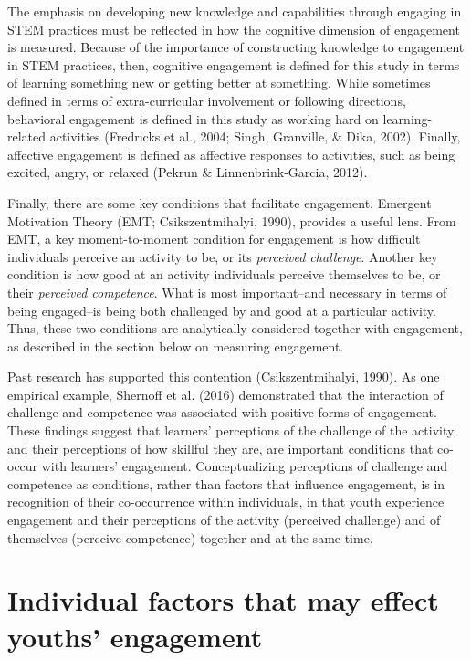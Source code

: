 \documentclass[]{msu-thesis}
\theoremstyle{definition}
\theoremstyle{definition}
\theoremstyle{definition}
\theoremstyle{remark}
\begin{document}
The emphasis on developing new knowledge and capabilities through
engaging in STEM practices must be reflected in how the cognitive
dimension of engagement is measured. Because of the importance of
constructing knowledge to engagement in STEM practices, then, cognitive
engagement is defined for this study in terms of learning something new
or getting better at something. While sometimes defined in terms of
extra-curricular involvement or following directions, behavioral
engagement is defined in this study as working hard on learning-related
activities (Fredricks et al., 2004; Singh, Granville, \& Dika, 2002).
Finally, affective engagement is defined as affective responses to
activities, such as being excited, angry, or relaxed (Pekrun \&
Linnenbrink-Garcia, 2012).

Finally, there are some key conditions that facilitate engagement.
Emergent Motivation Theory (EMT; Csikszentmihalyi, 1990), provides a
useful lens. From EMT, a key moment-to-moment condition for engagement
is how difficult individuals perceive an activity to be, or its
\emph{perceived challenge}. Another key condition is how good at an
activity individuals perceive themselves to be, or their \emph{perceived
competence}. What is most important--and necessary in terms of being
engaged--is being both challenged by and good at a particular activity.
Thus, these two conditions are analytically considered together with
engagement, as described in the section below on measuring engagement.

Past research has supported this contention (Csikszentmihalyi, 1990). As
one empirical example, Shernoff et al. (2016) demonstrated that the
interaction of challenge and competence was associated with positive
forms of engagement. These findings suggest that learners' perceptions
of the challenge of the activity, and their perceptions of how skillful
they are, are important conditions that co-occur with learners'
engagement. Conceptualizing perceptions of challenge and competence as
conditions, rather than factors that influence engagement, is in
recognition of their co-occurrence within individuals, in that youth
experience engagement and their perceptions of the activity (perceived
challenge) and of themselves (perceive competence) together and at the
same time.

\section{Individual factors that may effect youths'
engagement}\label{individual-factors-that-may-effect-youths-engagement}
\end{document}
